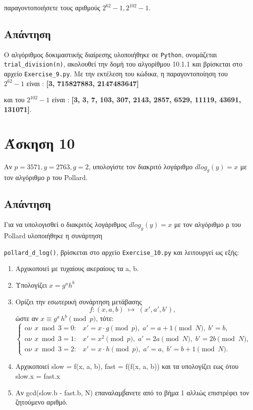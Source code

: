 \documentclass[12pt]{article}
\begin{document}
παραγοντοποιήσετε τους αριθμούς \(2^{62} - 1, 2^{102} - 1\).

\subsection*{Απάντηση}

O αλγόριθμος δοκιμαστικής διαίρεσης υλοποιήθηκε σε \texttt{Python}, ονομάζεται \texttt{trial\_division(n)}, ακολουθεί την δομή του αλγορίθμου 10.1.1  και βρίσκεται στο αρχείο 
\texttt{Exercise\_9.py}.  
\newline
\newline
Με την εκτέλεση του κώδικα, η παραγοντοποίηση του \( 2^{62} - 1 \) είναι : \textbf{[3, 715827883, 2147483647]} 

και του \( 2^{102} - 1 \) είναι : \textbf{[3, 3, 7, 103, 307, 2143, 2857, 6529, 11119, 43691, 131071]}.


\hfill \blacksquare
\section*{Άσκηση 10}

Αν \( p = 3571, y = 2763, g = 2\), υπολογίστε τον διακριτό λογάριθμο \( dlog_g(y) = x \) με τον αλγόριθμο ρ του Pollard.

\subsection*{Απάντηση}

Για να υπολογισθεί ο διακριτός λογάριθμος \( dlog_g(y) = x \)
με τον αλγόριθμο ρ του Pollard υλοποιήθηκε η συνάρτηση 

\texttt{pollard\_d\_log()}, βρίσκεται στο αρχείο \texttt{Exercise\_10.py} και λειτουργεί ως εξής:
\begin{enumerate}
    \item Αρχικοποιεί με τυχαίους ακεραίους τα a, b.
    \item Υπολογίζει \( x = g^ah^b \)
    \item Ορίζει την εσωτερική συνάρτηση μετάβασης
    \[
    f\colon (x,a,b)\;\mapsto\;(x',a',b'),
    \]
    ώστε αν \(x \equiv g^a\,h^b \pmod{p}\), τότε:
    \[
    \begin{cases}
        \text{αν }x \bmod 3 = 0: 
            & x' = x\cdot g \pmod{p},\; a' = a + 1 \pmod{N},\; b' = b,\\
        \text{αν }x \bmod 3 = 1: 
            & x' = x^2 \pmod{p},\; a' = 2a \pmod{N},\; b' = 2b \pmod{N},\\
        \text{αν }x \bmod 3 = 2: 
            & x' = x\cdot h \pmod{p},\; a' = a,\; b' = b + 1 \pmod{N}. 
    \end{cases}
    \]
    \item Αρχικοποιεί slow = f(x, a, b), fast = f(f(x, a, b))
    και τα υπολογίζει εως ότου slow.x = fast.x
    \item Αν gcd(slow.b - fast.b, N)  επαναλαμβ́ανετε από το βήμα 1 αλλιώς επιστρέφει τον ζητούμενο αριθμό.
\end{enumerate}
\end{document}

